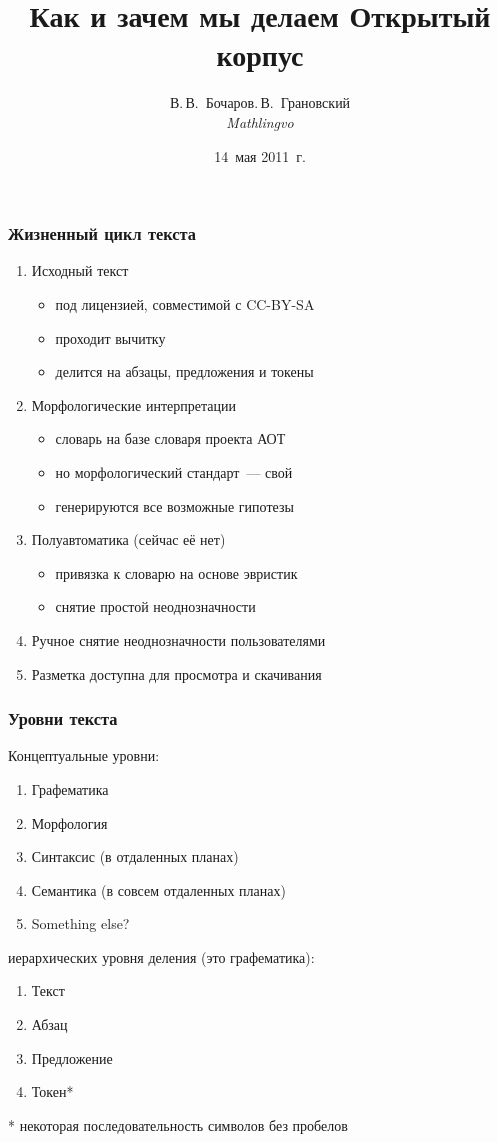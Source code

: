 \documentclass{beamer}
\title{Как и зачем мы делаем Открытый корпус}
\author{В.\,В.~Бочаров\andД.\,В.~Грановский\\\small\it Mathlingvo}
\date{14~мая 2011~г.}
\begin{document}
\maketitle

\begin{frame}
\frametitle{Жизненный цикл текста}
\begin{enumerate}
\item{Исходный текст}
    \begin{itemize}
    \item{под лицензией, совместимой с CC-BY-SA}
    \item{проходит вычитку}
    \item{делится на абзацы, предложения и токены}
    \end{itemize}
\pause
\item{Морфологические интерпретации}
    \begin{itemize}
    \item{словарь на базе словаря проекта АОТ}
    \item{но морфологический стандарт~--- свой}
    \item{генерируются все возможные гипотезы}
    \end{itemize}
\pause
\item{Полуавтоматика (сейчас её нет)}
    \begin{itemize}
    \item{привязка к словарю на основе эвристик}
    \item{снятие простой неоднозначности}
    \end{itemize}
\pause
\item{Ручное снятие неоднозначности пользователями}
\pause
\item{Разметка доступна для просмотра и скачивания}
\end{enumerate}
\end{frame}

\begin{frame}
\frametitle{Уровни текста}
Концептуальные уровни:
\begin{enumerate}
\item{Графематика}
\item{Морфология}
\item{Синтаксис} (в отдаленных планах)
\item{Семантика} (в совсем отдаленных планах)
\item{Something else?}
\end{enumerate}
 иерархических уровня деления (это графематика):
\begin{enumerate}
\item{Текст}
\item{Абзац}
\item{Предложение}
\item{Токен*}
\end{enumerate}
* некоторая последовательность символов без пробелов
\end{frame}
\end{document}
